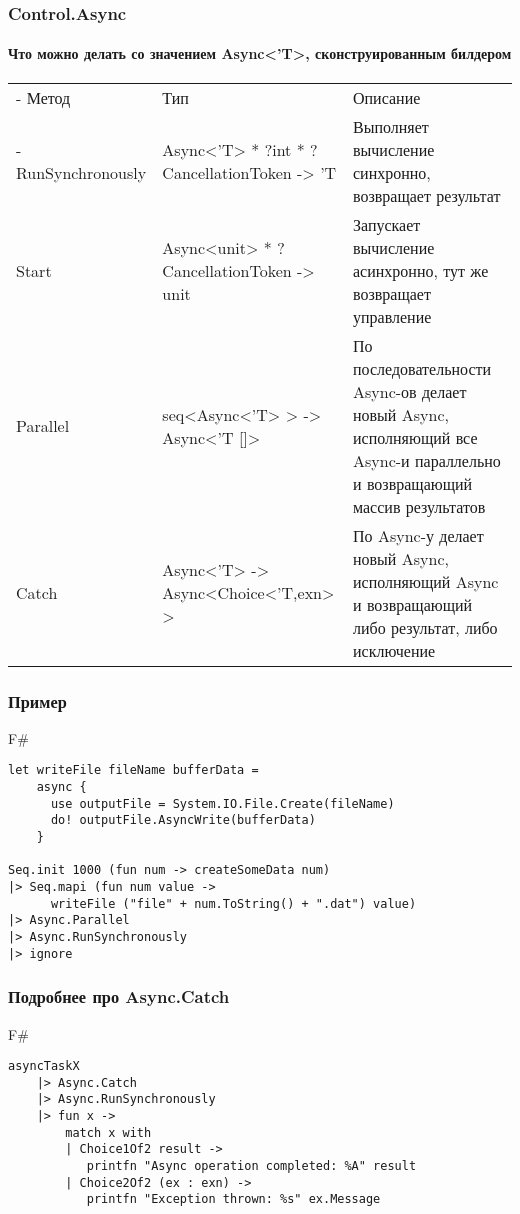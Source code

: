 \documentclass[xetex,mathserif,serif]{beamer}
\begin{document}
	\begin{frame}
		\frametitle{Control.Async}
		\framesubtitle{Что можно делать со значением Async<'T>, сконструированным билдером}
		\begin{footnotesize}
			\begin{tabu} {| X[0.7 l p] | X[1 l p] | X[1 l p] |}
				\tabucline-
				Метод              & Тип                                         & Описание           \\
				\tabucline-
				\everyrow{\tabucline-}
				RunSynchronously   & Async<'T> * ?int * ?CancellationToken -> 'T & Выполняет вычисление синхронно, возвращает результат \\
				Start              & Async<unit> * ?CancellationToken -> unit    & Запускает вычисление асинхронно, тут же возвращает управление \\
				Parallel           & seq<Async<'T> > -> Async<'T []>             & По последовательности Async-ов делает новый Async, исполняющий все Async-и параллельно и возвращающий массив результатов \\
				Catch              & Async<'T> -> Async<Choice<'T,exn> >         & По Async-у делает новый Async, исполняющий Async и возвращающий либо результат, либо исключение \\
			\end{tabu}
		\end{footnotesize}
	\end{frame}

	\begin{frame}[fragile]
		\frametitle{Пример}
		\begin{exampleblock}{F\#}
			\begin{verbatim}
let writeFile fileName bufferData =
    async {
      use outputFile = System.IO.File.Create(fileName)
      do! outputFile.AsyncWrite(bufferData) 
    }

Seq.init 1000 (fun num -> createSomeData num)
|> Seq.mapi (fun num value -> 
      writeFile ("file" + num.ToString() + ".dat") value)
|> Async.Parallel
|> Async.RunSynchronously
|> ignore
			\end{verbatim}
		\end{exampleblock}
\end{frame}

	\begin{frame}[fragile]
		\frametitle{Подробнее про Async.Catch}
		\begin{exampleblock}{F\#}
			\begin{verbatim}
asyncTaskX
    |> Async.Catch
    |> Async.RunSynchronously
    |> fun x ->
        match x with
        | Choice1Of2 result -> 
           printfn "Async operation completed: %A" result
        | Choice2Of2 (ex : exn) -> 
           printfn "Exception thrown: %s" ex.Message
			\end{verbatim}
		\end{exampleblock}
\end{frame}
	
\end{document}
